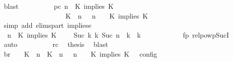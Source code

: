\begin{isabellebody}
\ blast\isanewline
\ \ \ \ \ \ \ \ \isamarkupfalse%
\ pc{\isacharcolon}{\isacartoucheopen}{\isacharparenleft}{\isasymGamma}{\isacharcomma}\ n\ {\isasymturnstile}\ {\isacharparenleft}K\ implies\ K\ {\isacharhash}\ {\isasymPsi}\ {\isasymtriangleright}\ {\isasymPhi}{\isacharparenright}\isanewline
\ \ \ \ \ \ \ \ \ \ \ \ \ \ \ \ \ \ {\isasymhookrightarrow}\ {\isacharparenleft}{\isacharparenleft}{\isacharparenleft}K\ {\isasymnot}{\isasymUp}\ n{\isacharparenright}\ {\isacharhash}\ {\isasymGamma}{\isacharparenright}{\isacharcomma}\ n\ {\isasymturnstile}\ {\isasymPsi}\ {\isasymtriangleright}\ {\isacharparenleft}{\isacharparenleft}K\ implies\ K\ {\isacharhash}\ {\isasymPhi}{\isacharparenright}{\isacharparenright}{\isacartoucheclose}\isanewline
\ \ \ \ \ \ \ \ \ \ \isamarkupfalse%
\ {\isacharparenleft}simp\ add{\isacharcolon}\ elims{\isacharunderscore}part\ implies{\isacharunderscore}e{}{\isacharparenright}\isanewline
\ \ \ \ \ \ \ \ \isamarkupfalse%
\ {\isacartoucheopen}{\isacharparenleft}{\isasymGamma}{\isacharcomma}\ n\ {\isasymturnstile}\ {\isacharparenleft}K\ implies\ K\ {\isacharhash}\ {\isasymPsi}\ {\isasymtriangleright}\ {\isasymPhi}{\isacharparenright}\ {\isasymhookrightarrow}\isactrlbsup Suc\ k\isactrlesup \ {\isacharparenleft}{\isasymGamma}\isactrlsub k{\isacharcomma}\ Suc\ n\ {\isasymturnstile}\ {\isasymPsi}\isactrlsub k\ {\isasymtriangleright}\ {\isasymPhi}\isactrlsub k{\isacharparenright}{\isacartoucheclose}\isanewline
\ \ \ \ \ \ \ \ \ \ \isamarkupfalse%
\ fp\ relpowp{\isacharunderscore}Suc{\isacharunderscore}I{}\ \isamarkupfalse%
\ auto\isanewline
\ \ \ \ \ \ \ \ \isamarkupfalse%
\ rc\ \isamarkupfalse%
\ {\isacharquery}thesis\ \isamarkupfalse%
\ blast\isanewline
\ \ \ \ \ \ \isamarkupfalse%
\isanewline
\ \ \ \ \ \ \isamarkupfalse%
\ \isamarkupfalse%
\ br{}{\isacharcolon}\ {\isacartoucheopen}{\isasymrho}\ {\isasymin}\ {\isasymlbrakk}\ {\isacharparenleft}{\isacharparenleft}K\ {\isasymUp}\ n{\isacharparenright}\ {\isacharhash}\ {\isacharparenleft}K\ {\isasymUp}\ n{\isacharparenright}\ {\isacharhash}\ {\isasymGamma}{\isacharparenright}{\isacharcomma}\ n\ {\isasymturnstile}\ {\isasymPsi}\ {\isasymtriangleright}\ {\isacharparenleft}{\isacharparenleft}K\ implies\ K\ {\isacharhash}\ {\isasymPhi}{\isacharparenright}\ {\isasymrbrakk}\isactrlsub c\isactrlsub o\isactrlsub n\isactrlsub f\isactrlsub i\isactrlsub g\isanewline

\end{isabellebody}
